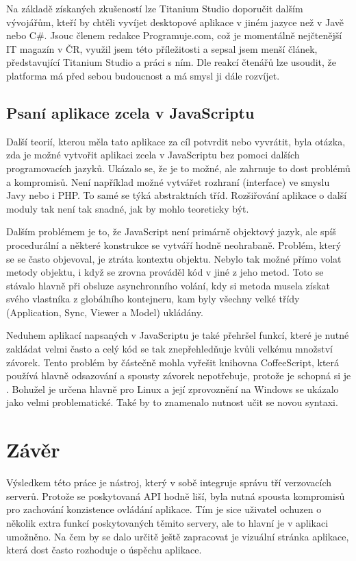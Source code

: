 Na základě získaných zkušeností lze Titanium Studio doporučit dalším vývojářům, kteří by chtěli vyvíjet desktopové aplikace v jiném jazyce než v Javě nebo C\#. Jsouc členem redakce Programuje.com, což je momentálně nejčtenější IT magazín v ČR, využil jsem této příležitosti a sepsal jsem menší článek, představující Titanium Studio a práci s ním. Dle reakcí čtenářů lze usoudit, že platforma má před sebou budoucnost a má smysl ji dále rozvíjet.

\subsection{Psaní aplikace zcela v JavaScriptu}

Další teorií, kterou měla tato aplikace za cíl potvrdit nebo vyvrátit, byla otázka, zda je možné vytvořit aplikaci zcela v JavaScriptu bez pomoci dalších programovacích jazyků. Ukázalo se, že je to možné, ale zahrnuje to dost problémů a kompromisů. Není například možné vytvářet rozhraní (interface) ve smyslu Javy nebo i PHP. To samé se týká abstraktních tříd. Rozšiřování aplikace o další moduly tak není tak snadné, jak by mohlo teoreticky být.

Dalším problémem je to, že JavaScript není primárně objektový jazyk, ale spíš procedurální a některé konstrukce se vytváří hodně neohrabaně. Problém, který se se často objevoval, je ztráta kontextu objektu. Nebylo tak možné přímo volat metody objektu, i když se zrovna prováděl kód v jiné z jeho metod. Toto se stávalo hlavně při obsluze asynchronního volání, kdy si metoda musela získat svého vlastníka z globálního kontejneru, kam byly všechny velké třídy (Application, Sync, Viewer a Model) ukládány.

Neduhem aplikací napsaných v JavaScriptu je také přehršel funkcí, které je nutné zakládat velmi často a celý kód se tak znepřehledňuje kvůli velkému množství závorek. Tento problém by částečně mohla vyřešit knihovna CoffeeScript, která používá hlavně odsazování a spousty závorek nepotřebuje, protože je schopná si je . Bohužel je určena hlavně pro Linux a její zprovoznění na Windows se ukázalo jako velmi problematické. Také by to znamenalo nutnost učit se novou syntaxi.

\section{Závěr}

Výsledkem této práce je nástroj, který v sobě integruje správu tří verzovacích serverů. Protože se poskytovaná API hodně liší, byla nutná spousta kompromisů pro zachování konzistence ovládání aplikace. Tím je sice uživatel ochuzen o několik extra funkcí poskytovaných těmito servery, ale to hlavní je v aplikaci umožněno. Na čem by se dalo určitě ještě zapracovat je vizuální stránka aplikace, která dost často rozhoduje o úspěchu aplikace.

